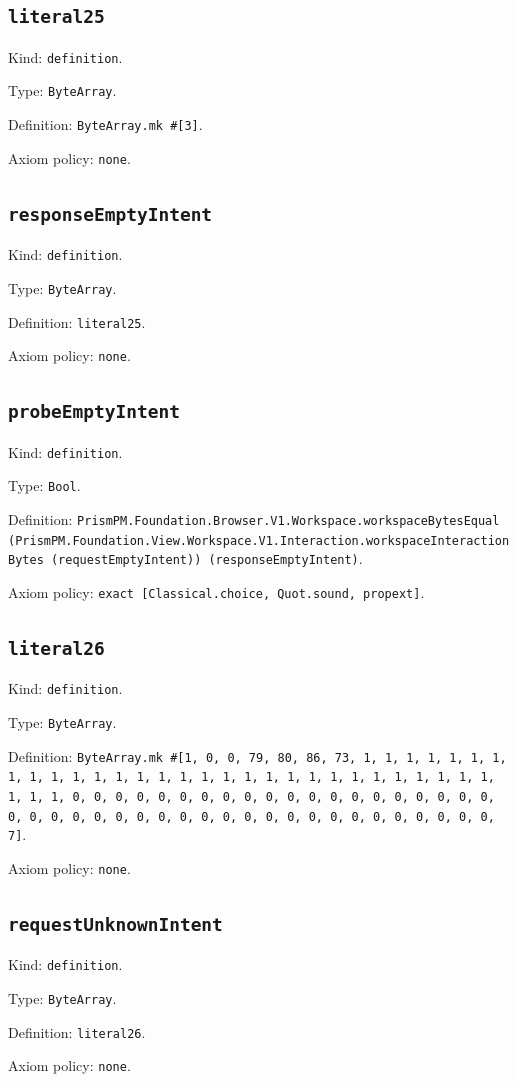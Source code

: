 \documentclass[11pt]{article}
\begin{document}
\subsection*{\texttt{literal25}}
\noindent Kind: \texttt{definition}.\par
\noindent Type: \texttt{ByteArray}.\par
\noindent Definition: \texttt{ByteArray.mk \#[3]}.\par
\noindent Axiom policy: \texttt{none}.\par
\subsection*{\texttt{responseEmptyIntent}}
\noindent Kind: \texttt{definition}.\par
\noindent Type: \texttt{ByteArray}.\par
\noindent Definition: \texttt{literal25}.\par
\noindent Axiom policy: \texttt{none}.\par
\subsection*{\texttt{probeEmptyIntent}}
\noindent Kind: \texttt{definition}.\par
\noindent Type: \texttt{Bool}.\par
\noindent Definition: \texttt{PrismPM.Foundation.Browser.V1.Workspace.workspaceBytesEqual (PrismPM.Foundation.View.Workspace.V1.Interaction.workspaceInteractionBytes (requestEmptyIntent)) (responseEmptyIntent)}.\par
\noindent Axiom policy: \texttt{exact [Classical.choice, Quot.sound, propext]}.\par
\subsection*{\texttt{literal26}}
\noindent Kind: \texttt{definition}.\par
\noindent Type: \texttt{ByteArray}.\par
\noindent Definition: \texttt{ByteArray.mk \#[1, 0, 0, 79, 80, 86, 73, 1, 1, 1, 1, 1, 1, 1, 1, 1, 1, 1, 1, 1, 1, 1, 1, 1, 1, 1, 1, 1, 1, 1, 1, 1, 1, 1, 1, 1, 1, 1, 1, 1, 0, 0, 0, 0, 0, 0, 0, 0, 0, 0, 0, 0, 0, 0, 0, 0, 0, 0, 0, 0, 0, 0, 0, 0, 0, 0, 0, 0, 0, 0, 0, 0, 0, 0, 0, 0, 0, 0, 0, 0, 0, 0, 0, 7]}.\par
\noindent Axiom policy: \texttt{none}.\par
\subsection*{\texttt{requestUnknownIntent}}
\noindent Kind: \texttt{definition}.\par
\noindent Type: \texttt{ByteArray}.\par
\noindent Definition: \texttt{literal26}.\par
\noindent Axiom policy: \texttt{none}.\par
\end{document}
